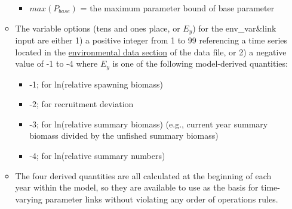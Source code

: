 \begin{itemize}
\begin{itemize}
\begin{itemize}
           \item $max(P_{base})$ = the maximum parameter bound of base parameter
        \end{itemize}
		\item The variable options (tens and ones place, or $E_{y}$) for the env\_var\&link input are either 1) a positive integer from 1 to 99 referencing a time series located in the \hyperlink{env-dat}{environmental data section} of the data file, or 2) a negative value of -1 to -4 where $E_y$ is one of the following model-derived quantities:
		\begin{itemize}
			\item -1;  for ln(relative spawning biomass)
			\item -2;  for recruitment deviation
			\item -3;  for ln(relative summary biomass) (e.g., current year summary biomass divided by the unfished summary biomass)
			\item -4;  for ln(relative summary numbers)
		\end{itemize}
		\item The four derived quantities are all calculated at the beginning of each year within the model, so they are available to use as the basis for time-varying parameter links without violating any order of operations rules.
	\end{itemize}
	

\end{itemize}
